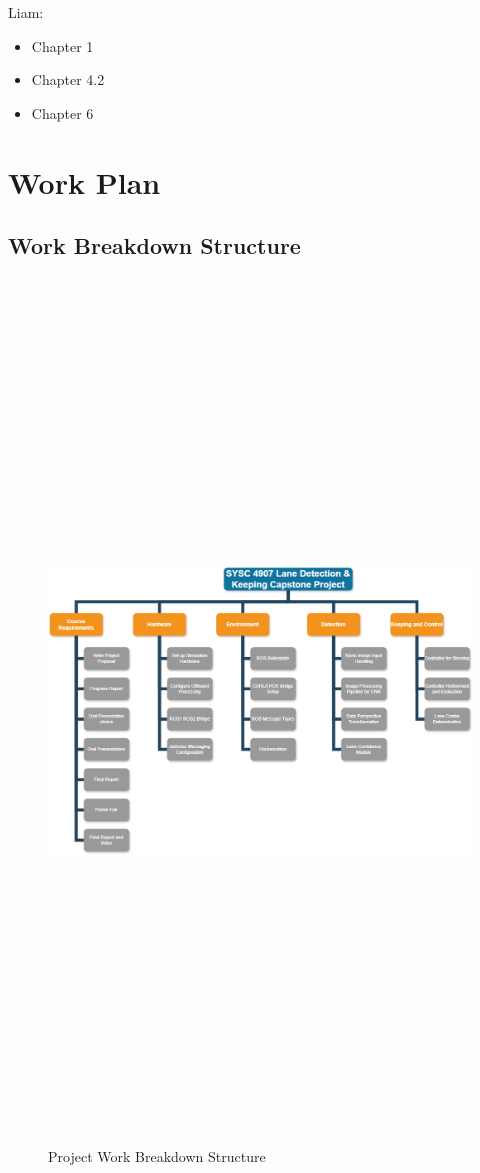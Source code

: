 \documentclass[titlepage,draft]{article}
\begin{document}
Liam:
\begin{itemize}
	\item Chapter 1
	\item Chapter 4.2
	\item Chapter 6
\end{itemize}

\section{Work Plan}

\subsection{Work Breakdown Structure}

\begin{figure}[H]
	\centering
	\includegraphics[angle=90,height=9in]{wbs}
	\caption{Project Work Breakdown Structure}
	\label{fig:wbs}
\end{figure}
\end{document}
